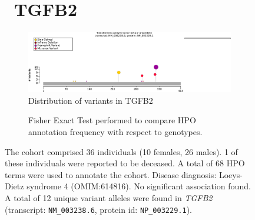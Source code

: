 \begin{figure}[htbp]
\section*{ TGFB2}
\centering
\begin{subfigure}[b]{0.95\textwidth}
\centering
\includegraphics[width=\textwidth]{ img/TGFB2_protein_diagram.pdf} 
\captionsetup{justification=raggedright,singlelinecheck=false}
\caption{Distribution of variants in TGFB2}
\end{subfigure}

\vspace{2em}

\begin{subfigure}[b]{0.95\textwidth}
\centering
{}
\captionsetup{justification=raggedright,singlelinecheck=false}
\caption{Fisher Exact Test performed to compare HPO annotation frequency with respect to genotypes. }
\end{subfigure}

\vspace{2em}

\caption{ The cohort comprised 36 individuals (10 females, 26 males). 1 of these individuals were reported to be deceased. A total of 68 HPO terms were used to annotate the cohort. Disease diagnosis: Loeys-Dietz syndrome 4 (OMIM:614816). No significant association found. A total of 12 unique variant alleles were found in \textit{TGFB2} (transcript: \texttt{NM\_003238.6}, protein id: \texttt{NP\_003229.1}).}
\end{figure}
